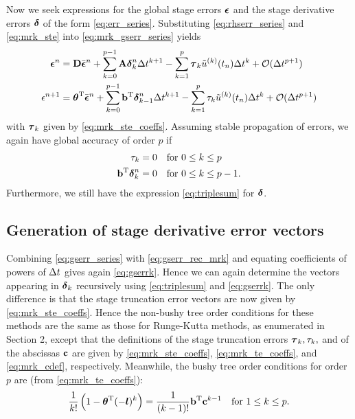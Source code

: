 Now we seek expressions for the global stage errors $\boldsymbol{\epsilon}$ and
the stage derivative errors $\boldsymbol{\delta}$ of the form \eqref{eq:err_series}.
Substituting \eqref{eq:rhserr_series} and \eqref{eq:mrk_ste}
into \eqref{eq:mrk_gserr_series} yields %
\begin{subequations} \label{eq:gserr_rec_mrk_both}
\begin{align} \label{eq:gserr_rec_mrk}
\boldsymbol{\epsilon}^n & =\mathbf{D} \bar{\boldsymbol{\epsilon}}^n + \sum_{k=0}^{p-1} \mathbf{A} \boldsymbol{\delta}^n_k \Delta t^{k+1} -\sum_{k=1}^{p} \boldsymbol{\tau}_k \tilde{u}^{(k)}(t_{n}) \Delta t^k + {\cal O}(\Delta t^{p+1}) \\
\epsilon^{n+1} & = \boldsymbol{\theta}^\mathrm{T} \bar{\boldsymbol{\epsilon}}^n + \sum_{k=0}^{p-1} \mathbf{b}^\mathrm{T}\boldsymbol{\delta}^n_{k-1} \Delta t^{k+1} -\sum_{k=1}^{p} \tau_k \tilde{u}^{(k)}(t_{n}) \Delta t^k + {\cal O}(\Delta t^{p+1}) 
\end{align}
\end{subequations}
with $\boldsymbol{\tau}_k$ given by \eqref{eq:mrk_ste_coeffs}.
Assuming stable propagation of errors, we again have global accuracy of order $p$
if 
\begin{align*}    
\tau_k & = 0  & \mbox{for }  & 0\le k\le p \\
\mathbf{b}^\mathrm{T}\boldsymbol{\delta}^n_k & = 0 &  \mbox{for } & 0\le k\le p-1.
\end{align*}
Furthermore, we still have the expression \eqref{eq:triplesum} for $\boldsymbol{\delta}$.

\subsection{Generation of stage derivative error vectors\label{recursion}}
Combining \eqref{eq:gserr_series} with \eqref{eq:gserr_rec_mrk} and equating
coefficients of powers of $\Delta t$ gives again \eqref{eq:gserrk}.
Hence we can again determine the vectors appearing in $\boldsymbol{\delta}_k$ recursively using
\eqref{eq:triplesum} and \eqref{eq:gserrk}.  The only difference is that the stage truncation
error vectors are now given by \eqref{eq:mrk_ste_coeffs}.  
Hence the non-bushy tree order conditions for these methods are the same as those for
Runge-Kutta methods, as enumerated in Section 2, except that the definitions of the stage truncation
errors $\boldsymbol{\tau}_k, \tau_k,$ and of the abscissas $\mathbf{c}$ are given by \eqref{eq:mrk_ste_coeffs},
\eqref{eq:mrk_te_coeffs}, and \eqref{eq:mrk_cdef}, respectively.
Meanwhile, the bushy tree order conditions for order $p$ are (from \eqref{eq:mrk_te_coeffs}):
\begin{align*}
\frac{1}{k!}\left(1-\btheta\transpose(-\vl)^k\right) & = \frac{1}{(k-1)!}\bb\transpose \bc^{k-1} 
            & \mbox{for } 1\le k\le p.%
\end{align*}


